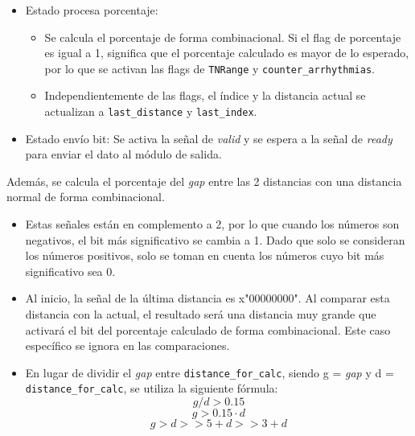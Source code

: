 \begin{itemize}
    \item Estado procesa porcentaje: 
    \begin{itemize}
        \item Se calcula el porcentaje de forma combinacional. Si el flag de porcentaje es igual a 1, significa que el porcentaje calculado es mayor de lo esperado, por lo que se activan las flags de \texttt{TNRange} y \texttt{counter\_arrhythmias}.
        \item Independientemente de las flags, el índice y la distancia actual se actualizan a \texttt{last\_distance} y \texttt{last\_index}.
    \end{itemize}
    \item Estado envío bit: Se activa la señal de \textit{valid} y se espera a la señal de \textit{ready} para enviar el dato al módulo de salida.
\end{itemize}

Además, se calcula el porcentaje del  \textit{gap}  entre las 2 distancias con una distancia normal de forma combinacional.

\begin{itemize}
    \item Estas señales están en complemento a 2, por lo que cuando los números son negativos, el bit más significativo se cambia a 1. Dado que solo se consideran los números positivos, solo se toman en cuenta los números cuyo bit más significativo sea 0.
    \item Al inicio, la señal de la última distancia es x"00000000". Al comparar esta distancia con la actual, el resultado será una distancia muy grande que activará el bit del porcentaje calculado de forma combinacional. Este caso específico se ignora en las comparaciones.
    \item En lugar de dividir el  \textit{gap}  entre \texttt{distance\_for\_calc},  siendo g =  \textit{gap}  y d = \texttt{distance\_for\_calc}, se utiliza la siguiente fórmula:
    \[ g/d > 0.15\] 
    \[g > 0.15 \cdot d \] 
    \[g > d>> 5 + d>> 3 + d\] 
\end{itemize}

